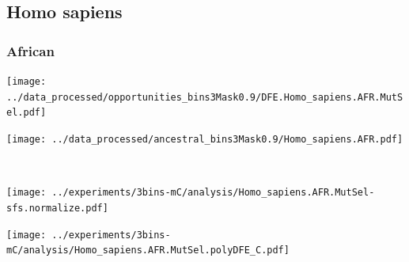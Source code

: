 \subsection{Homo sapiens}

\subsubsection{African}

\begin{minipage}{0.49\linewidth}
    \texttt{[image: ../data\_processed/opportunities\_bins3Mask0.9/DFE.Homo\_sapiens.AFR.MutSel.pdf]}
\end{minipage}
\begin{minipage}{0.49\linewidth}
    \texttt{[image: ../data\_processed/ancestral\_bins3Mask0.9/Homo\_sapiens.AFR.pdf]}
\end{minipage}
\\
\begin{minipage}{0.49\linewidth}
    \texttt{[image: ../experiments/3bins-mC/analysis/Homo\_sapiens.AFR.MutSel-sfs.normalize.pdf]}
\end{minipage}
\begin{minipage}{0.4\linewidth}
    \texttt{[image: ../experiments/3bins-mC/analysis/Homo\_sapiens.AFR.MutSel.polyDFE\_C.pdf]}
\end{minipage}
